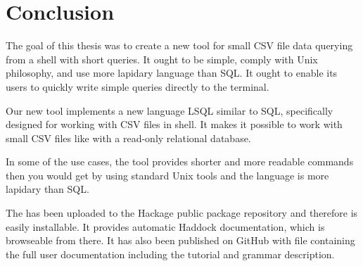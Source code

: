 \chapter*{Conclusion}

The goal of this thesis was to create a new tool for small CSV file data querying from a shell with short queries.
It ought to be simple, comply with Unix philosophy, and use more lapidary language than SQL.
It ought to enable its users to quickly write simple queries directly to the terminal.

Our new tool  implements a new language LSQL similar to
SQL, specifically designed for working with CSV files in shell. It makes it possible to work with small CSV files like with a read-only relational database.

In some of the use cases, the tool provides shorter and more readable commands then you would get by using standard Unix tools and the 
language is more lapidary than SQL.

The  has been uploaded to the Hackage public package repository and therefore is easily installable. 
It provides automatic Haddock documentation, which is browseable from there. 
It has also been published on GitHub with  file containing the full user documentation including the tutorial and grammar description.

